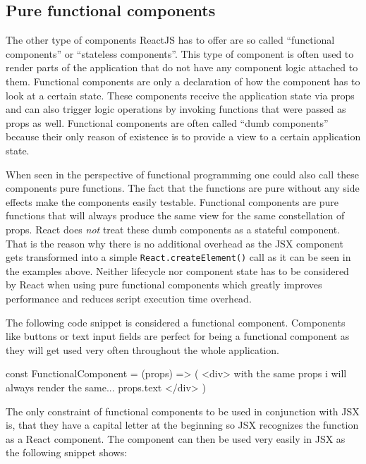 

\subsection{Pure functional components} 
\label{ssec:PureFunctionalComponent}

The other type of components ReactJS has to offer are so called \enquote{functional components} or \enquote{stateless components}. This type of component is often used to render parts of the application that do not have any component logic attached to them. Functional components are only a declaration of how the component has to look at a certain state. These components receive the application state via props and can also trigger logic operations by invoking functions that were passed as props as well. Functional components are often called \enquote{dumb components} because their only reason of existence is to provide a view to a certain application state.

When seen in the perspective of functional programming one could also call these components pure functions. The fact that the functions are pure without any side effects make the components easily testable. Functional components are pure functions that will always produce the same view for the same constellation of props. React does \emph{not} treat these dumb components as a stateful component. That is the reason why there is no additional overhead as the JSX component gets transformed into a simple \texttt{React.createElement()} call as it can be seen in the examples above. Neither lifecycle nor component state has to be considered by React when using pure functional components which greatly improves performance and reduces script execution time overhead. 

The following code snippet is considered a functional component. Components like buttons or text input fields are perfect for being a functional component as they will get used very often throughout the whole application.

\begin{JsCode}
const FunctionalComponent = (props) => (
  <div>
    with the same props i will always render the same...
    {props.text}
  </div>
)
\end{JsCode}

The only constraint of functional components to be used in conjunction with JSX is, that they have a capital letter at the beginning so JSX recognizes the function as a React component. The component can then be used very easily in JSX as the following snippet shows:

